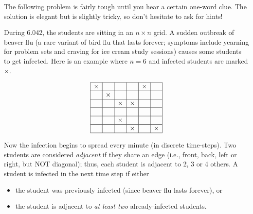 \documentclass[twoside,12pt]{article}
\begin{document}
\begin{problem}{18}
The following problem is fairly tough until you hear a certain
one-word clue. The solution is elegant but is slightly tricky, so don't hesitate to ask for hints!

During 6.042, the students are sitting in
an $n\times n$ grid. A sudden outbreak of beaver flu (a rare variant of bird flu that lasts forever; symptoms include yearning for problem sets and craving for ice cream study sessions) causes some students to get infected. Here is
an example where $n = 6$ and infected students are marked $\times$.

\[
\begin{array}{|c|c|c|c|c|c|}
\hline
\times& & & &\times& \\ \hline
 &\times& & & & \\ \hline
& &\times&\times& & \\ \hline
& & & & & \\ \hline
& &\times& & & \\ \hline
& & &\times& &\times \\ \hline
\end{array}
\]

\noindent Now the infection begins to spread every minute (in discrete time-steps). Two students are considered \textit{adjacent} if they
share an edge (i.e., front, back, left or right, but NOT diagonal); thus, each student is adjacent to 2, 3 or 4 others.  A
student is infected in the next time step if either

\begin{itemize}
\item the student was previously infected (since beaver flu lasts forever), or
\item the student is adjacent to \textit{at least two} already-infected students.
\end{itemize}


\end{problem}
\end{document}
